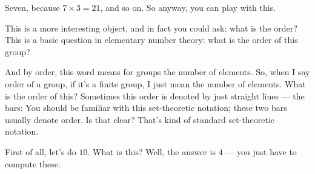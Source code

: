 \begin{speech}[00:08:44 - 00:09:45]
Seven, because $7 \times 3 = 21$, and so on. So anyway, you can play with this.

This is a more interesting object, and in fact you could ask: what is the order? This is a basic question in elementary number theory: what is the order of this group? 

And by order, this word means for groups the number of elements.  So, when I say order of a group, if it's a finite group, I just mean the number of elements. What is the order of this? Sometimes this order is denoted by just straight lines --- the bars:  You should be familiar with this set-theoretic notation; these two bars usually denote order. Is that clear? That's kind of standard set-theoretic notation.

First of all, let's do $10$. What is this? Well, the answer is $4$ --- you just have to compute these. 
\end{speech}

